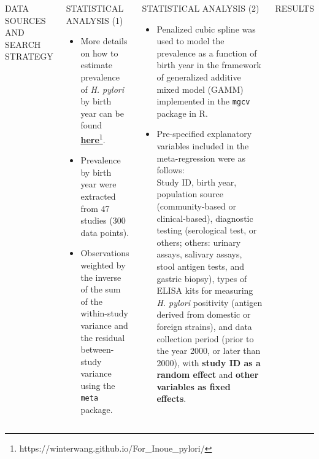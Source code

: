 \documentclass[english,xcolor=table,t
]{beamer}
\begin{document}
\begin{frame}
\begin{columns}
\begin{block}{DATA SOURCES AND SEARCH STRATEGY}
\caption{Figure 1: PRISMA Flowchart of Study Selection}

\end{block}

\begin{block}{STATISTICAL ANALYSIS (1)}

\begin{itemize}
\item
  More details on how to estimate prevalence of \emph{H. pylori} by
  birth year can be found
  \href{https://winterwang.github.io/For_Inoue_pylori/}{\textbf{here}}\footnote{https://winterwang.github.io/For\_Inoue\_pylori/}.
\item
  Prevalence by birth year were extracted from 47 studies (300 data
  points).
\item
  Observations weighted by the inverse of the sum of the within-study
  variance and the residual between-study variance using the
  \texttt{meta} package.
\end{itemize}

\end{block}


\begin{block}{STATISTICAL ANALYSIS (2)}

\begin{itemize}
\item
  Penalized cubic spline was used to model the prevalence as a function
  of birth year in the framework of generalized additive mixed model
  (GAMM) implemented in the \texttt{mgcv} package in R.
\item
  Pre-specified explanatory variables included in the meta-regression
  were as follows:\\
  Study ID, birth year, population source (community-based or
  clinical-based), diagnostic testing (serological test, or others;
  others: urinary assays, salivary assays, stool antigen tests, and
  gastric biopsy), types of ELISA kits for measuring \emph{H. pylori}
  positivity (antigen derived from domestic or foreign strains), and
  data collection period (prior to the year 2000, or later than 2000),
  with \textbf{study ID as a random effect} and \textbf{other variables
  as fixed effects}.
\end{itemize}

\end{block}

\begin{block}{RESULTS}


\end{block}
\end{columns}
\end{frame}
\end{document}
